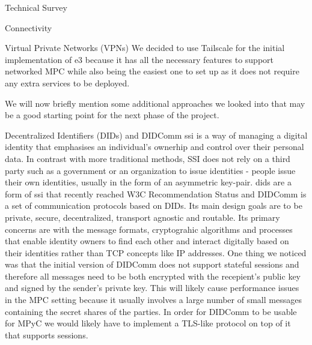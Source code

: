 \begin{frame}{Technical Survey}
\begin{block}{Connectivity}
\begin{block}{Virtual Private Networks (VPNs)}
We decided to use Tailscale for the initial implementation of \gls{e3}
because it has all the necessary features to support networked MPC while
also being the easiest one to set up as it does not require any extra
services to be deployed.

We will now briefly mention some additional approaches we looked into
that may be a good starting point for the next phase of the project.
\end{block}

\begin{block}{Decentralized Identifiers (DIDs) and DIDComm}
\protect\hypertarget{decentralized-identifiers-dids-and-didcomm}{}
\gls{ssi} is a way of managing a digital identity that emphasises an
individual's ownerhip and control over their personal data. In contrast
with more traditional methods, SSI does not rely on a third party such
as a government or an organization to issue identities - people issue
their own identities, usually in the form of an asymmetric key-pair.
\glspl{did}\autocite{didW3C} are a form of \gls{ssi} that recently
reached W3C Recommendation Status and DIDComm\autocite{didcommSpec} is a
set of communication protocols based on DIDs. Its main design goals are
to be private, secure, decentralized, transport agnostic and routable.
Its primary concerns are with the message formats, cryptograhic
algorithms and processes that enable identity owners to find each other
and interact digitally based on their identities rather than TCP
concepts like IP addresses. One thing we noticed was that the initial
version of DIDComm does not support stateful sessions and therefore all
messages need to be both encrypted with the recepient's public key and
signed by the sender's private key. This will likely cause performance
issues in the MPC setting because it usually involves a large number of
small messages containing the secret shares of the parties. In order for
DIDComm to be usable for MPyC we would likely have to implement a
TLS-like protocol on top of it that supports sessions.
\end{block}


\end{block}
\end{frame}
